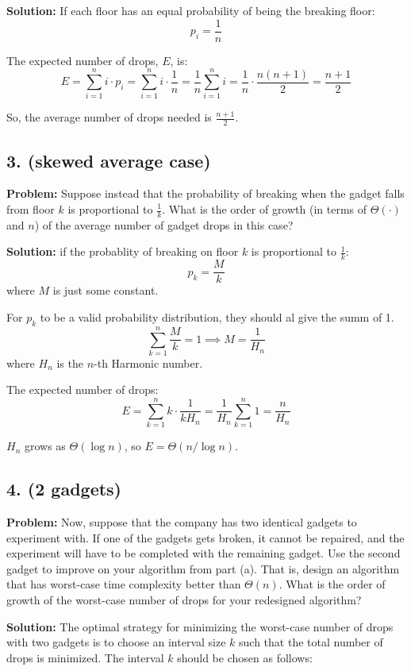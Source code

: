 \documentclass{article}
\begin{document}
\textbf{Solution:} If each floor has an equal probability of being the breaking floor:
\[
p_i = \frac{1}{n}
\]

The expected number of drops, \( E \), is:
\[
E = \sum_{i=1}^n i \cdot p_i = \sum_{i=1}^n i \cdot \frac{1}{n} = \frac{1}{n} \sum_{i=1}^n i = \frac{1}{n} \cdot \frac{n(n+1)}{2} = \frac{n+1}{2}
\]

So, the average number of drops needed is \( \frac{n+1}{2} \).

\subsection*{3. (skewed average case)}
\textbf{Problem:} Suppose instead that the probability of breaking when the gadget falls from floor \( k \) is proportional to \( \frac{1}{k} \). What is the order of growth (in terms of \( \Theta(\cdot) \) and \( n \)) of the average number of gadget drops in this case?

\textbf{Solution:}
if the probablity of breaking on floor \( k \) is proportional to \( \frac{1}{k} \):
\[
p_k = \frac{M}{k}
\]
where \( M \) is just some constant.

For \( p_k \) to be a valid probability distribution, they should al give the summ of 1.
\[
\sum_{k=1}^n \frac{M}{k} = 1 \implies M = \frac{1}{H_n}
\]
where \( H_n \) is the \( n \)-th Harmonic number.

The expected number of drops:
\[
E = \sum_{k=1}^n k \cdot \frac{1}{kH_n} = \frac{1}{H_n} \sum_{k=1}^n 1 = \frac{n}{H_n}
\]

\( H_n \) grows as \( \Theta(\log n) \), so \( E = \Theta(n / \log n) \).

\subsection*{4. (2 gadgets)}
\textbf{Problem:} Now, suppose that the company has two identical gadgets to experiment with. If one of the gadgets gets broken, it cannot be repaired, and the experiment will have to be completed with the remaining gadget. Use the second gadget to improve on your algorithm from part (a). That is, design an algorithm that has worst-case time complexity better than \( \Theta(n) \). What is the order of growth of the worst-case number of drops for your redesigned algorithm?

\textbf{Solution:} The optimal strategy for minimizing the worst-case number of drops with two gadgets is to choose an interval size \( k \) such that the total number of drops is minimized. The interval \( k \) should be chosen as follows:
\end{document}
